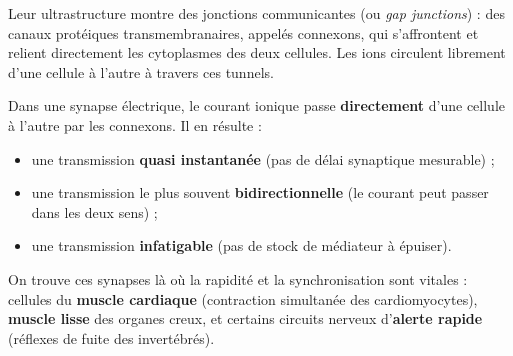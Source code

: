 \documentclass[11pt]{article}
\newcommand{\cle}[1]{{\popxbold\color{popdark}#1}}
\begin{document}
Leur ultrastructure montre des \cle{jonctions communicantes} (ou \emph{gap junctions}) : des canaux protéiques transmembranaires, appelés \cle{connexons}, qui s'affrontent et relient directement les cytoplasmes des deux cellules. Les ions circulent librement d'une cellule à l'autre à travers ces tunnels.

\begin{propriete}
Dans une synapse électrique, le courant ionique passe \textbf{directement} d'une cellule à l'autre par les connexons. Il en résulte :
\begin{itemize}
\item une transmission \textbf{quasi instantanée} (pas de délai synaptique mesurable) ;
\item une transmission le plus souvent \textbf{bidirectionnelle} (le courant peut passer dans les deux sens) ;
\item une transmission \textbf{infatigable} (pas de stock de médiateur à épuiser).
\end{itemize}
On trouve ces synapses là où la rapidité et la synchronisation sont vitales : cellules du \textbf{muscle cardiaque} (contraction simultanée des cardiomyocytes), \textbf{muscle lisse} des organes creux, et certains circuits nerveux d'\textbf{alerte rapide} (réflexes de fuite des invertébrés).
\end{propriete}
\end{document}
